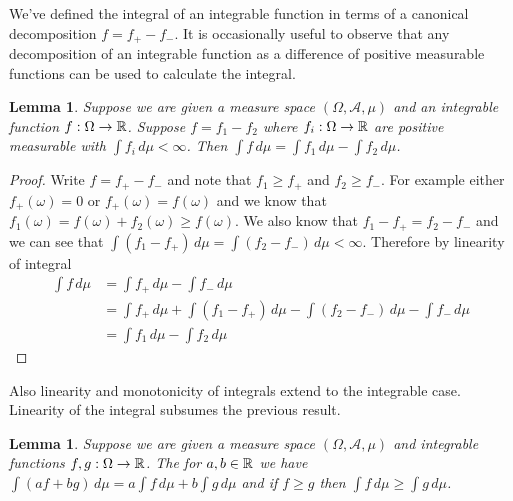 \documentclass{amsart}
\newtheorem{lem}[thm]{Lemma}
\theoremstyle{remark}
\theoremstyle{definition}
\begin{document}
We've defined the integral of an integrable function in terms of a
canonical decomposition $f = f_+ - f_-$.  It is occasionally useful to
observe that any decomposition of an integrable function as a
difference of positive measurable functions can be used to calculate
the integral.
\begin{lem}Suppose we are given a measure space $(\Omega, \mathcal{A},
  \mu)$ and an integrable function $f : \Omega \to \mathbb{R}$.  Suppose
  $f = f_1 -f_2$ where $f_i  : \Omega \to \mathbb{R}$ are positive measurable
  with $\int f_i \, d \mu < \infty$. Then $\int f \, d\mu = \int f_1 \,
  d\mu - \int f_2 \, d\mu$.
\end{lem}
\begin{proof}Write $f = f_+ - f_-$ and note that $f_1 \geq f_+$ and
  $f_2 \geq f_-$.  For example either $f_+(\omega) = 0$ or
  $f_+(\omega) = f(\omega)$ and we know that $f_1(\omega) = f(\omega)
  + f_2(\omega) \geq f(\omega)$.  We also know that $f_1 - f_+ = f_2 -
  f_-$ and we can see that $\int (f_1 - f_+) \, d\mu = \int (f_2 - f_-) \, d\mu 
  < \infty$.  Therefore by
  linearity of integral
\begin{align*}
\int f \, d\mu &= \int f_+ \, d\mu - \int  f_- \, d\mu \\
&= \int f_+ \, d\mu + \int (f_1 - f_+) \, d\mu - \int (f_2 - f_-) \,
d\mu - \int  f_- \, d\mu \\
&= \int f_1 \, d\mu - \int  f_2 \, d\mu
\end{align*}
\end{proof}
Also linearity and monotonicity of integrals extend to the integrable
case.  Linearity of the integral subsumes the previous result.
\begin{lem}Suppose we are given a measure space $(\Omega, \mathcal{A},
  \mu)$ and integrable functions $f,g: \Omega \to \mathbb{R}$.  The for
  $a,b \in \mathbb{R}$ we have $\int (af + bg) \, d\mu = a\int f \, d\mu +
  b\int g \, d\mu$ and if $f \geq g$ then $\int f \, d\mu \geq \int g \, d\mu$.
\end{lem}
\end{document}
